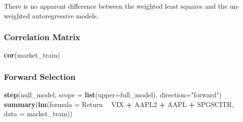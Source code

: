 \documentclass[]{article}
\newenvironment{Shaded}{\begin{snugshade}}{\end{snugshade}}
\newcommand{\KeywordTok}[1]{\textcolor[rgb]{0.13,0.29,0.53}{\textbf{#1}}}
\newcommand{\DataTypeTok}[1]{\textcolor[rgb]{0.13,0.29,0.53}{#1}}
\newcommand{\DecValTok}[1]{\textcolor[rgb]{0.00,0.00,0.81}{#1}}
\newcommand{\StringTok}[1]{\textcolor[rgb]{0.31,0.60,0.02}{#1}}
\newcommand{\OperatorTok}[1]{\textcolor[rgb]{0.81,0.36,0.00}{\textbf{#1}}}
\newcommand{\NormalTok}[1]{#1}
\begin{document}
\begin{Shaded}
\end{Shaded}

There is no apparent difference between the weighted least squares and
the un-weighted autoregressive models.

\subsubsection{Correlation Matrix}\label{correlation-matrix}

\begin{Shaded}
\begin{Highlighting}[]
\KeywordTok{cor}\NormalTok{(market_train)}
\end{Highlighting}
\end{Shaded}

\subsubsection{Forward Selection}\label{forward-selection}

\begin{Shaded}
\begin{Highlighting}[]
\KeywordTok{step}\NormalTok{(null_model, }\DataTypeTok{scope =} \KeywordTok{list}\NormalTok{(}\DataTypeTok{upper=}\NormalTok{full_model), }\DataTypeTok{direction=}\StringTok{"forward"}\NormalTok{)}
\KeywordTok{summary}\NormalTok{(}\KeywordTok{lm}\NormalTok{(}\DataTypeTok{formula =}\NormalTok{ Return }\OperatorTok{~}\StringTok{ }\NormalTok{VIX }\OperatorTok{+}\StringTok{ }\NormalTok{AAPL2 }\OperatorTok{+}\StringTok{ }\NormalTok{AAPL }\OperatorTok{+}\StringTok{ }\NormalTok{SPGSCITR, }\DataTypeTok{data =}\NormalTok{ market_train))}
\end{Highlighting}
\end{Shaded}
\end{document}

